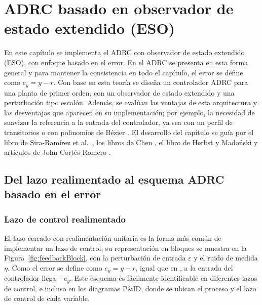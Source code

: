 \chapter{ADRC basado en observador de estado extendido (ESO)}
\label{cap:ADRC-ESO}


En este capítulo se implementa el ADRC con observador de estado extendido
(ESO), con enfoque basado en el error. En \cite{sira2017adrc} el ADRC se presenta
en esta forma general y para mantener la consistencia en todo el capítulo, el
error se define como $e_y = y - r$. Con base en esta teoría se diseña un controlador
ADRC para una planta de primer orden, con un observador de estado extendido y una
perturbación tipo escalón. Además, se evalúan las ventajas de esta arquitectura y
las desventajas que aparecen en su implementación; por ejemplo, la necesidad de
suavizar la referencia a la entrada del controlador, ya sea con un perfil de
transitorios \cite[sec.~6.3]{herbst2024adrc} o con polinomios de Bézier
\cite{sira2017adrc}. El desarrollo del capítulo se guía por el libro de
Sira-Ramírez et al.\ \cite{sira2017adrc}, los libros de Chen
\cite{chen1993analog,chen1999linear}, el libro de Herbst y Madoński
\cite{herbst2024adrc} y artículos de John Cortés-Romero
\cite{rojas2020equivalence,vargas2026microgrids}.



\section{Del lazo realimentado al esquema ADRC basado en el error}
\label{sec:adrc_esquema}

\subsection{Lazo de control realimentado}
\label{sec:adrc_generalidades}

El lazo cerrado con realimentación unitaria es la forma más común de implementar
un lazo de control; su representación en bloques se muestra en la
Figura~\ref{fig:feedbackBlock}, con la perturbación de entrada $\varepsilon$ y el ruido de medida $\eta$.
Como el error se define como $e_y = y - r$, igual
que en \cite{sira2017adrc}, a la entrada del controlador llega
$-e_y$. Este esquema es fácilmente identificable en diferentes lazos de control,
e incluso en los diagramas P\&ID, donde se ubican el proceso y el lazo de control
de cada variable.

